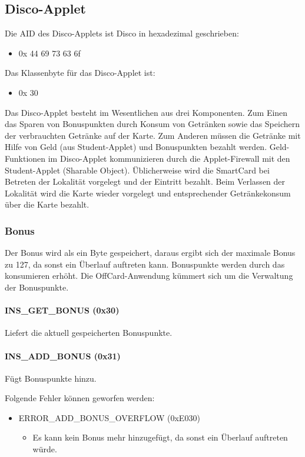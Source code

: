 \subsection{Disco-Applet}
Die AID des Disco-Applets ist Disco in hexadezimal geschrieben:
\begin{itemize}
	\item 0x 44 69 73 63 6f
\end{itemize}
Das Klassenbyte für das Disco-Applet ist:
\begin{itemize}
	\item 0x 30
\end{itemize}

Das Disco-Applet besteht im Wesentlichen aus drei Komponenten.
Zum Einen das Sparen von Bonuspunkten durch Konsum von Getränken sowie das Speichern der verbrauchten Getränke auf der Karte.
Zum Anderen müssen die Getränke mit Hilfe von Geld (aus Student-Applet) und Bonuspunkten bezahlt werden. 
Geld-Funktionen im Disco-Applet kommunizieren durch die Applet-Firewall mit den Student-Applet (Sharable Object).
Üblicherweise wird die SmartCard bei Betreten der Lokalität vorgelegt und der Eintritt bezahlt.
Beim Verlassen der Lokalität wird die Karte wieder vorgelegt und entsprechender Getränkekonsum über die Karte bezahlt.

\subsubsection{Bonus}
Der Bonus wird als ein Byte gespeichert, daraus ergibt sich der maximale Bonus zu 127, da sonst ein Überlauf auftreten kann.
Bonuspunkte werden durch das konsumieren erhöht.
Die OffCard-Anwendung kümmert sich um die Verwaltung der Bonuspunkte.

\paragraph{INS\_GET\_BONUS (0x30)}
Liefert die aktuell gespeicherten Bonuspunkte.
\paragraph{INS\_ADD\_BONUS (0x31)}
Fügt Bonuspunkte hinzu.

Folgende Fehler können geworfen werden:
\begin{itemize}
	\item ERROR\_ADD\_BONUS\_OVERFLOW (0xE030)
	\begin{itemize}
		\item Es kann kein Bonus mehr hinzugefügt, da sonst ein Überlauf auftreten würde.
	\end{itemize}
\end{itemize}
